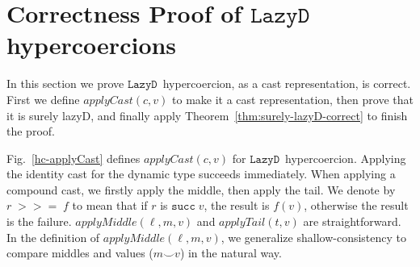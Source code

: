 \documentclass[acmsmall,review,anonymous]{acmart}\settopmatter{printfolios=true,printccs=false,printacmref=false}
\newcommand{\figref}[1]{Fig.~\ref{#1}}
\newcommand{\lazyD}{$\mathtt{Lazy D}$}
\newcommand{\rOOsucc}[1]{\mathtt{succ}\;#1}
\begin{document}
\section{Correctness Proof of \lazyD{} hypercoercions}
\label{sec:hypercoercion-correctness}

In this section we prove \lazyD\ hypercoercion, as a cast representation, is 
correct. First we define $ applyCast(c,v) $ to make it a cast representation, 
then prove that it is surely lazyD, and finally apply 
Theorem~\ref{thm:surely-lazyD-correct} to finish the proof.


\figref{hc-applyCast} defines $ applyCast(c,v) $ for \lazyD\ hypercoercion. 
Applying the identity cast for the 
dynamic type succeeds immediately. When applying a compound cast, we firstly 
apply the middle, then apply the tail. We denote by $ r \; >>= \; f $ to mean 
that if $ r $ is $ \rOOsucc{v} $, the result is $ f(v) $, otherwise the result 
is the failure.
$ applyMiddle(\ell,m,v) $ and $ applyTail(t,v) $ are straightforward.
In the definition of $ applyMiddle(\ell,m,v) $, we generalize 
shallow-consistency to compare middles and values ($ m \smile v $) in the 
natural way.
\end{document}
